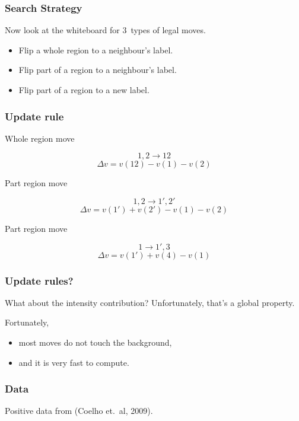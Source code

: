 \documentclass{beamer}
\begin{document}
\begin{frame}[fragile]
\frametitle{Search Strategy}

Now look at the whiteboard for 3~types of legal moves.

\begin{itemize}
\item Flip a whole region to a neighbour's label.
\item Flip part of a region to a neighbour's label.
\item Flip part of a region to a new label.
\end{itemize}

\end{frame}

\begin{frame}[fragile]
\frametitle{Update rule}

\begin{block}{Whole region move}

\[
1,2 \rightarrow 12
\]
\[
\Delta v = v(12) - v(1) - v(2)
\]
\end{block}

\pause


\begin{block}{Part region move}

\[
1,2 \rightarrow 1',2'
\]
\[
\Delta v = v(1') + v(2') - v(1) - v(2)
\]
\end{block}

\begin{block}{Part region move}

\[
1 \rightarrow 1',3
\]
\[
\Delta v = v(1') + v(4) - v(1)
\]
\end{block}

\end{frame}

\begin{frame}[fragile]
\frametitle{Update rules?}

What about the \alert{intensity} contribution?
\pause
Unfortunately, that's a global property.
\bigskip

Fortunately,
\begin{itemize}
\item most moves do not touch the background,
\item and it is very fast to compute.
\end{itemize}
\end{frame}

\begin{frame}[fragile]
\frametitle{Data}

Positive data from (Coelho et.\ al, 2009).

\end{frame}
\end{document}
